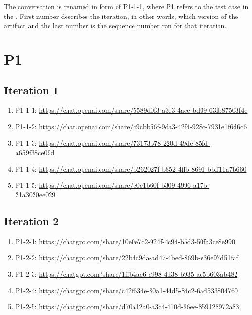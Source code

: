 
The conversation is renamed in form of P1-1-1, where P1 refers to the test case in the \textcite{act_rule_g88}. First number describes the iteration, in other words, which version of the artifact and the last number is the sequence number ran for that iteration.


\section{P1\label{P1-1}}

\subsection{Iteration 1}

\begin{enumerate}
    \item P1-1-1: \href{https://chat.openai.com/share/5589d0f3-a3e3-4aee-bd09-63fb87503f4e}{https://chat.openai.com/share/5589d0f3-a3e3-4aee-bd09-63fb87503f4e}
    \item P1-1-2: \href{https://chat.openai.com/share/c9cbb56f-9da3-42f4-928c-7931e1f6d6c6}{https://chat.openai.com/share/c9cbb56f-9da3-42f4-928c-7931e1f6d6c6}
    \item P1-1-3: \href{https://chat.openai.com/share/73173b78-220d-49de-85fd-a659f38ce09d}{https://chat.openai.com/share/73173b78-220d-49de-85fd-a659f38ce09d}
    \item P1-1-4: \href{https://chat.openai.com/share/b262027f-b852-4ffb-8691-bbff11a7b660}{https://chat.openai.com/share/b262027f-b852-4ffb-8691-bbff11a7b660}
    \item P1-1-5: \href{https://chat.openai.com/share/e0c1b60f-b309-4996-a17b-21a3020ee029}{https://chat.openai.com/share/e0c1b60f-b309-4996-a17b-21a3020ee029}
\end{enumerate}

\subsection{Iteration 2}

\begin{enumerate}
    \item P1-2-1: \href{https://chatgpt.com/share/10e0e7c2-924f-4c94-b5d3-50fa3ce8e990}{https://chatgpt.com/share/10e0e7c2-924f-4c94-b5d3-50fa3ce8e990}
    \item P1-2-2: \href{https://chatgpt.com/share/22b4c9da-ad47-4bed-869b-e36e97d51faf}{https://chatgpt.com/share/22b4c9da-ad47-4bed-869b-e36e97d51faf}
    \item P1-2-3: \href{https://chatgpt.com/share/1ffb4ae6-c998-4d38-b935-ac5b603ab482}{https://chatgpt.com/share/1ffb4ae6-c998-4d38-b935-ac5b603ab482}
    \item P1-2-4: \href{https://chatgpt.com/share/c42f634e-80a1-44d5-84c2-6ad533804760}{https://chatgpt.com/share/c42f634e-80a1-44d5-84c2-6ad533804760}
    \item P1-2-5: \href{https://chatgpt.com/share/d70a12a0-a3c4-410d-86ee-859128972a83}{https://chatgpt.com/share/d70a12a0-a3c4-410d-86ee-859128972a83}
\end{enumerate}

